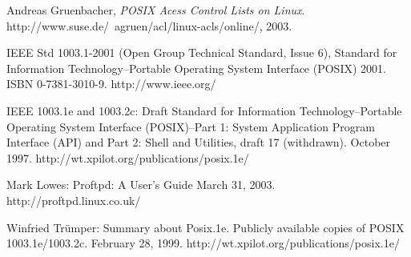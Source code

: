 \begin{thebibliography}{9}
 
  Andreas Gruenbacher,
  \emph{POSIX Acess Control Lists on Linux}.
  http://www.suse.de/~agruen/acl/linux-acls/online/,
  2003.

    IEEE Std 1003.1-2001 (Open Group Technical Standard, Issue 6), 
	Standard for Information Technology--Portable Operating System Interface (POSIX) 2001. 
	ISBN 0-7381-3010-9. 
	http://www.ieee.org/

    IEEE 1003.1e and 1003.2c: Draft Standard for Information Technology--Portable Operating System Interface (POSIX)--Part 1: System Application Program Interface (API) and Part 2: Shell and Utilities, draft 17 (withdrawn). 
	October 1997. 
	http://wt.xpilot.org/publications/posix.1e/

	Mark Lowes: 
	Proftpd: 
	A User's Guide March 31, 2003. 
	http://proftpd.linux.co.uk/

    Winfried Trümper: Summary about Posix.1e. Publicly available copies of POSIX 1003.1e/1003.2c. February 28, 1999. http://wt.xpilot.org/publications/posix.1e/

\end{thebibliography}

